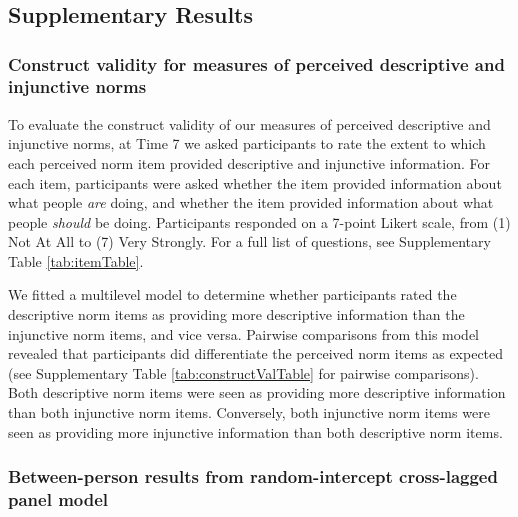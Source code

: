 \documentclass[
  man, donotrepeattitle,floatsintext]{apa6}
\begin{document}
\hypertarget{section}{%
\section{}\label{section}}

\hypertarget{supplementary-results}{%
\subsection{Supplementary Results}\label{supplementary-results}}

\hypertarget{construct-validity-for-measures-of-perceived-descriptive-and-injunctive-norms}{%
\subsubsection{Construct validity for measures of perceived descriptive and injunctive norms}\label{construct-validity-for-measures-of-perceived-descriptive-and-injunctive-norms}}

To evaluate the construct validity of our measures of perceived descriptive and injunctive norms, at Time 7 we asked participants to rate the extent to which each perceived norm item provided descriptive and injunctive information. For each item, participants were asked whether the item provided information about what people \emph{are} doing, and whether the item provided information about what people \emph{should} be doing. Participants responded on a 7-point Likert scale, from (1) Not At All to (7) Very Strongly. For a full list of questions, see Supplementary Table \ref{tab:itemTable}.

We fitted a multilevel model to determine whether participants rated the descriptive norm items as providing more descriptive information than the injunctive norm items, and vice versa. Pairwise comparisons from this model revealed that participants did differentiate the perceived norm items as expected (see Supplementary Table \ref{tab:constructValTable} for pairwise comparisons). Both descriptive norm items were seen as providing more descriptive information than both injunctive norm items. Conversely, both injunctive norm items were seen as providing more injunctive information than both descriptive norm items.

\hypertarget{between-person-results-from-random-intercept-cross-lagged-panel-model}{%
\subsubsection{Between-person results from random-intercept cross-lagged panel model}\label{between-person-results-from-random-intercept-cross-lagged-panel-model}}
\end{document}
